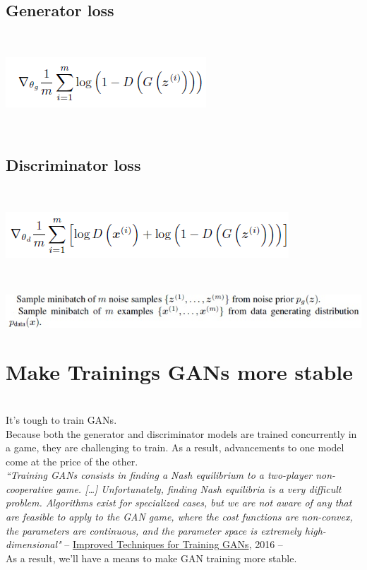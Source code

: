 \documentclass[14pt]{article}
\begin{document}
\subsection{Generator loss}
\\
\begin{center}
    \includegraphics[width = 11 cm ]{8.png}
\end{center}
\\
\subsection{Discriminator loss }

\\
\begin{center}
    \includegraphics[width = 11 cm ]{9.png}
\end{center}
\\
\begin{center}
    \includegraphics[width = 12 cm ]{10.jpg}
\end{center}
\section{Make Trainings GANs more stable}
\\
It's tough to train GANs.\\
Because both the generator and discriminator models are trained concurrently in a game, they are challenging to train. As a result, advancements to one model come at the price of the other.
\\
\hspace*{1cm} \textit{“Training GANs consists in finding a Nash equilibrium to a two-player non-cooperative game. […] Unfortunately, finding Nash equilibria is a very difficult problem. Algorithms exist for specialized cases, but we are not aware of any that are feasible to apply to the GAN game, where the cost functions are non-convex, the parameters are continuous, and the parameter space is extremely high-dimensional"}
\hspace*{4cm} -- \hyperlink{https://arxiv.org/abs/1606.03498}{Improved Techniques for Training GANs}, 2016 -- 
\\
As a result, we'll have a means to make GAN training more stable.
\\
\end{document}
